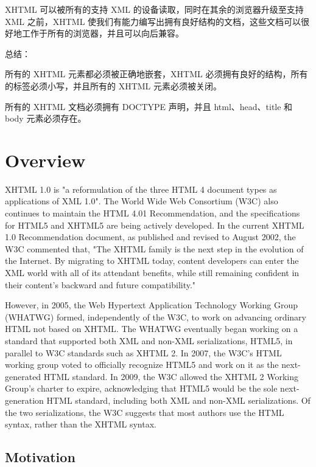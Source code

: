 XHTML 可以被所有的支持 XML 的设备读取，同时在其余的浏览器升级至支持 XML 之前，XHTML 使我们有能力编写出拥有良好结构的文档，这些文档可以很好地工作于所有的浏览器，并且可以向后兼容。

总结：

\begin{compactitem}
\item 所有的 XHTML 元素都必须被正确地嵌套，XHTML 必须拥有良好的结构，所有的标签必须小写，并且所有的 XHTML 元素必须被关闭。
\item 所有的 XHTML 文档必须拥有 DOCTYPE 声明，并且 html、head、title 和 body 元素必须存在。
\end{compactitem}


\chapter{Overview}

XHTML 1.0 is "a reformulation of the three HTML 4 document types as applications of XML 1.0". The World Wide Web Consortium (W3C) also continues to maintain the HTML 4.01 Recommendation, and the specifications for HTML5 and XHTML5 are being actively developed. In the current XHTML 1.0 Recommendation document, as published and revised to August 2002, the W3C commented that, "The XHTML family is the next step in the evolution of the Internet. By migrating to XHTML today, content developers can enter the XML world with all of its attendant benefits, while still remaining confident in their content's backward and future compatibility."

However, in 2005, the Web Hypertext Application Technology Working Group (WHATWG) formed, independently of the W3C, to work on advancing ordinary HTML not based on XHTML. The WHATWG eventually began working on a standard that supported both XML and non-XML serializations, HTML5, in parallel to W3C standards such as XHTML 2. In 2007, the W3C's HTML working group voted to officially recognize HTML5 and work on it as the next-generated HTML standard. In 2009, the W3C allowed the XHTML 2 Working Group's charter to expire, acknowledging that HTML5 would be the sole next-generation HTML standard, including both XML and non-XML serializations. Of the two serializations, the W3C suggests that most authors use the HTML syntax, rather than the XHTML syntax.

\section{Motivation}

